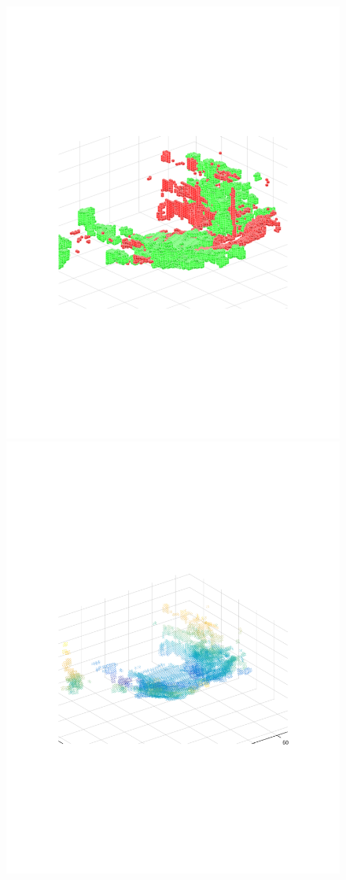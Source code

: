 \documentclass{UCF_ETD}
\begin{document}
\begin{figure}[H] 
\begin{center}
\includegraphics[scale=0.55]{RobustRegistration/ProblemScan12_13CloseUpImRegister}
\includegraphics[scale=0.55]{RobustRegistration/ProblemScan12_13CloseUpICP}

\end{center}
\end{figure}
\end{document}
